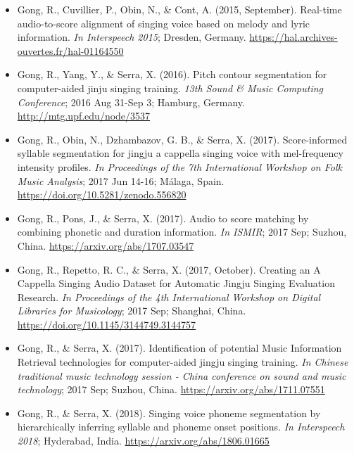 \begin{itemize}[leftmargin=*]
	\item Gong, R., Cuvillier, P., Obin, N., \& Cont, A. (2015, September). Real-time audio-to-score alignment of singing voice based on melody and lyric information. \textit{In Interspeech 2015}; Dresden, Germany. \newline \url{https://hal.archives-ouvertes.fr/hal-01164550}
	\item Gong, R., Yang, Y., \& Serra, X. (2016). Pitch contour segmentation for computer-aided jinju singing training. \textit{13th Sound \& Music Computing Conference}; 2016 Aug 31-Sep 3; Hamburg, Germany. \newline \url{http://mtg.upf.edu/node/3537}
	\item Gong, R., Obin, N., Dzhambazov, G. B., \& Serra, X. (2017). Score-informed syllable segmentation for jingju a cappella singing voice with mel-frequency intensity profiles. \textit{In Proceedings of the 7th International Workshop on Folk Music Analysis}; 2017 Jun 14-16; Málaga, Spain. \newline \url{https://doi.org/10.5281/zenodo.556820}
	\item Gong, R., Pons, J., \& Serra, X. (2017). Audio to score matching by combining phonetic and duration information. \textit{In ISMIR}; 2017 Sep; Suzhou, China. \newline \url{https://arxiv.org/abs/1707.03547}
	\item Gong, R., Repetto, R. C., \& Serra, X. (2017, October). Creating an A Cappella Singing Audio Dataset for Automatic Jingju Singing Evaluation Research. \textit{In Proceedings of the 4th International Workshop on Digital Libraries for Musicology}; 2017 Sep; Shanghai, China. \newline \url{https://doi.org/10.1145/3144749.3144757}
	\item Gong, R., \& Serra, X. (2017). Identification of potential Music Information Retrieval technologies for computer-aided jingju singing training. \textit{In Chinese traditional music technology session - China conference on sound and music technology}; 2017 Sep; Suzhou, China. \newline \url{https://arxiv.org/abs/1711.07551}
	\item Gong, R., \& Serra, X. (2018). Singing voice phoneme segmentation by hierarchically inferring syllable and phoneme onset positions. \textit{In Interspeech 2018}; Hyderabad, India. \newline \url{https://arxiv.org/abs/1806.01665}
\end{itemize} 

